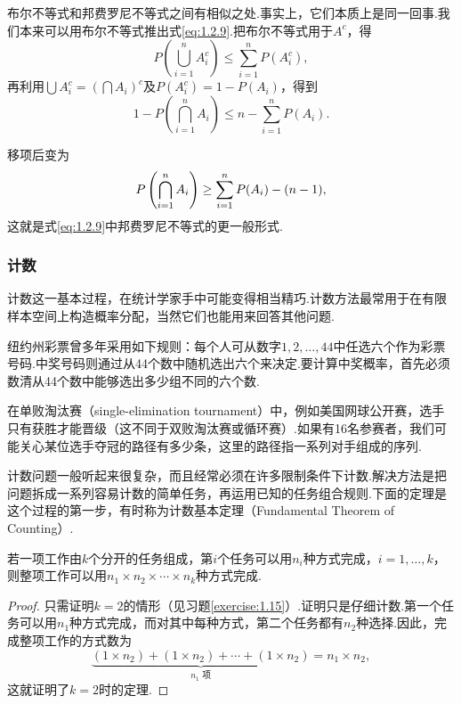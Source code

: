布尔不等式和邦费罗尼不等式之间有相似之处.事实上，它们本质上是同一回事.我们本来可以用布尔不等式推出式\eqref{eq:1.2.9}.把布尔不等式用于$A^c$，得
$$P\left(\bigcup_{i=1}^n A_i^c\right)\le\sum_{i=1}^n P(A_i^c),$$
再利用$\bigcup A_i^c=(\bigcap A_i)^c$及$P(A_i^c)=1-P(A_i)$，得到
$$1-P\left(\bigcap_{i=1}^n A_i\right)\le n-\sum_{i=1}^n P(A_i).$$


移项后变为
\begin{equation}\label{eq:1.2.10}\index{SI0560@Bonferroni}
P\left(\bigcap_{i=1}^n A_i\right)\ge\sum_{i=1}^n P(A_i)-(n-1),
\end{equation}
这就是式\eqref{eq:1.2.9}中邦费罗尼不等式的更一般形式.

\subsubsection{计数}\label{sec:1.2.3}
计数这一基本过程，在统计学家手中可能变得相当精巧.计数方法最常用于在有限样本空间上构造概率分配，当然它们也能用来回答其他问题.
\begin{example}[彩票——I]\label{ex:1.2.12}
纽约州彩票曾多年采用如下规则：每个人可从数字$1,2,\ldots,44$中任选六个作为彩票号码.中奖号码则通过从44个数中随机选出六个来决定.要计算中奖概率，首先必须数清从44个数中能够选出多少组不同的六个数.
\end{example}
\begin{example}[锦标赛]\label{ex:1.2.13}
在单败淘汰赛（single-elimination tournament）中，例如美国网球公开赛，选手只有获胜才能晋级（这不同于双败淘汰赛或循环赛）.如果有16名参赛者，我们可能关心某位选手夺冠的路径有多少条，这里的路径指一系列对手组成的序列.
\end{example}
计数问题一般听起来很复杂，而且经常必须在许多限制条件下计数.解决方法是把问题拆成一系列容易计数的简单任务，再运用已知的任务组合规则.下面的定理是这个过程的第一步，有时称为计数基本定理（Fundamental Theorem of Counting）.
\begin{theorem}\label{thm:1.2.14}
若一项工作由$k$个分开的任务组成，第$i$个任务可以用$n_i$种方式完成，$i=1,\ldots,k$，则整项工作可以用$n_1\times n_2\times\cdots\times n_k$种方式完成.
\end{theorem}
\begin{proof}
只需证明$k=2$的情形（见习题\ref{exercise:1.15}）.证明只是仔细计数.第一个任务可以用$n_1$种方式完成，而对其中每种方式，第二个任务都有$n_2$种选择.因此，完成整项工作的方式数为
$$\underbrace{(1\times n_2)+(1\times n_2)+\cdots+(1\times n_2)}_{n_1\text{ 项}}=n_1\times n_2,$$
这就证明了$k=2$时的定理.
\end{proof}
